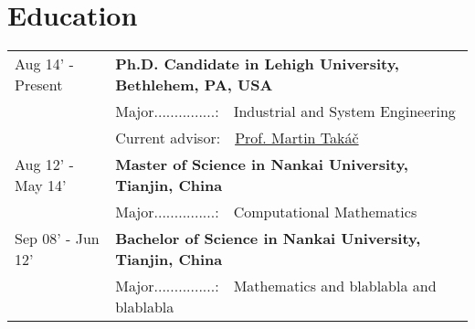 \documentclass[letters,11pt]{article} %
\begin{document}

\section{Education}
\begin{longtable}{>{\centering}p{3.3cm}|p{14cm}}
Aug 14' - Present &  \textbf{Ph.D. Candidate in Lehigh University, Bethlehem, PA, USA}   \\
&Major...............:~~Industrial and System Engineering \\
&Current advisor:~~\href{http://mtakac.com/}{Prof. Martin Takáč} \\
Aug 12' - May 14'&  \textbf{Master of Science in Nankai University, Tianjin, China} \\
&Major...............:~~Computational Mathematics\\
Sep 08' - Jun 12' & \normalsize\textbf{Bachelor of Science in Nankai University, Tianjin, China} \\
&Major...............:~~Mathematics and blablabla and blablabla\\
\end{longtable}

\end{document}
